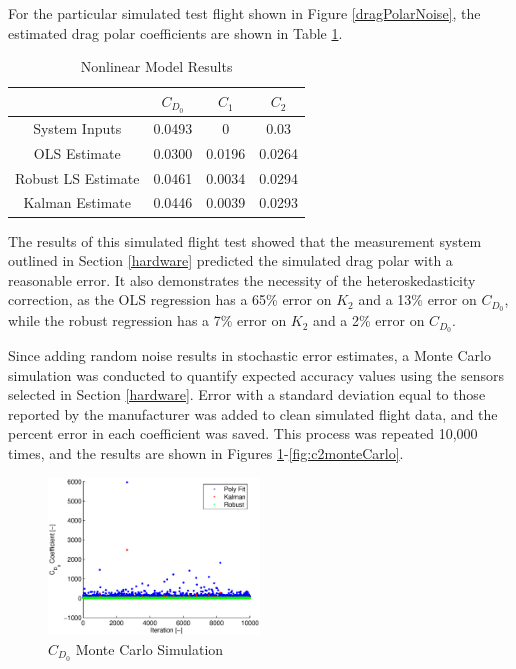 For the particular simulated test flight shown in Figure \ref{dragPolarNoise}, the estimated drag polar coefficients are shown in Table \ref{simCoeffErrorTable}.

\begin{table}[ht]
\caption{Nonlinear Model Results}
\label{simCoeffErrorTable}
\centering
\begin{tabular}{c c c c}
\hline\hline
 & $C_{D_0}$ & $C_1$ & $C_2$ \\
 \hline
System Inputs & 0.0493 & 0 & 0.03 \\
OLS Estimate & 0.0300 & 0.0196 & 0.0264 \\
Robust LS Estimate & 0.0461 & 0.0034 & 0.0294 \\
Kalman Estimate & 0.0446 & 0.0039 & 0.0293 \\
\hline
\end{tabular}
\end{table}

The results of this simulated flight test showed that the measurement system outlined in Section \ref{hardware} predicted the simulated drag polar with a reasonable error. It also demonstrates
 the necessity of the heteroskedasticity correction, as the OLS regression has a 65\% error on $K_2$ and a 13\% error on $C_{D_0}$, while the robust regression has a 7\% error on $K_2$ and a 2\% error on $C_{D_0}$.

Since adding random noise results in stochastic error estimates, a Monte Carlo simulation was conducted to quantify expected accuracy values using the sensors selected in Section \ref{hardware}. Error with a standard deviation equal to those reported by the manufacturer was added to clean simulated flight data, and the percent error in each coefficient was saved. This process was repeated 10,000 times, and the results are shown in Figures \ref{fig:cd0monteCarlo}-\ref{fig:c2monteCarlo}.
\begin{figure}[H]
  \centering
    \includegraphics[width=0.5\textwidth]{figures/cd0monteCarlo.eps}
      \caption{$C_{D_0}$ Monte Carlo Simulation}
      \label{fig:cd0monteCarlo}
\end{figure}

